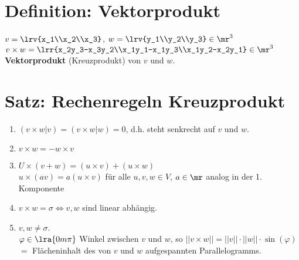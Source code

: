 \section{Definition: Vektorprodukt}
	$ v=\lrv{x_1\\x_2\\x_3} $, $ w=\lrv{y_1\\y_2\\y_3}\in\mr^3 $\\
	$ v\times w=\lrr{x_2y_3-x_3y_2\\x_1y_1-x_1y_3\\x_1y_2-x_2y_1}\in\mr^3 $
	\textbf{Vektorprodukt} (Kreuzprodukt) von $ v $ und $ w $.

\section{Satz: Rechenregeln Kreuzprodukt}
	\begin{enumerate}
		\item $ (v\times w|v)=(v\times w|w)=0 $, d.h. steht senkrecht auf $ v $ und $ w $.
		\item  $ v\times w =-w\times v$
		\item  $ U\times(v+w)=(u\times v)+(u\times w)$\\
		$ u\times(av)=a(u\times v) $ für alle $ u,v,w\in V $, $ a\in\mr $ analog in der 1. Komponente
		\item  $ v\times w=\sigma\Leftrightarrow v,w $ sind linear abhängig.
		\item  $ v,w\neq\sigma $.\\
		$ \varphi\in\lra{0m\pi} $ Winkel zwischen $ v $ und $ w $, so $ ||v\times w||=||v||\cdot ||w||\cdot\sin(\varphi) $\\
		$ = $ Flächeninhalt des von $ v $ und $ w $ aufgespannten Parallelogramms.

	\end{enumerate}
